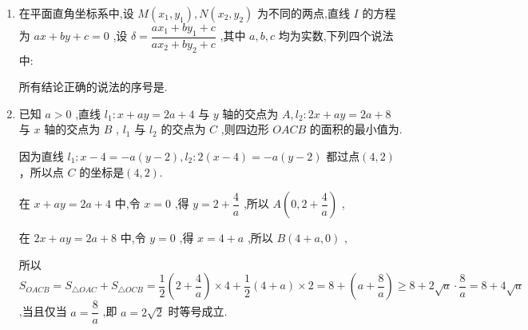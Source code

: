 \begin{enumerate}
    \item 在平面直角坐标系中,设 $M\left( {{x}_{1},{y}_{1}}\right) ,N\left( {{x}_{2},{y}_{2}}\right)$ 为不同的两点,直线 $I$ 的方程为 ${ax} + {by} + c = 0$ ,设 $\delta  = \dfrac{a{x}_{1} + b{y}_{1} + c}{a{x}_{2} + b{y}_{2} + c}$ ,其中 $a,b,c$ 均为实数,下列四个说法中:
    所有结论正确的说法的序号是.
    \begin{jieda}
    \end{jieda}
    
    \item 已知 $a > 0$ ,直线 ${l}_{1} : x + {ay} = {2a} + 4$ 与 $y$ 轴的交点为 ${A},{l}_{2} : {2x} + {ay} = {2a} + 8$ 与 $x$ 轴的交点为 $B$ , ${l}_{1}$ 与 ${l}_{2}$ 的交点为 $C$ ,则四边形 ${OACB}$ 的面积的最小值为.
    \begin{jieda}
        因为直线 ${l}_{1} : x - 4 =  - a\left( {y - 2}\right) ,{l}_{2} : 2\left( {x - 4}\right)  =  - a\left( {y - 2}\right)$ 都过点$(4,2)$，所以点 $C$ 的坐标是$(4,2)$.
        
        在 $x + {ay} = {2a} + 4$ 中,令 $x = 0$ ,得 $y = 2 + \dfrac{4}{a}$ ,所以 $A\left( {0,2 + \dfrac{4}{a}}\right)$ ,
        
        在 ${2x} + {ay} = {2a} + 8$ 中,令 $y = 0$ ,得 $x = 4 + a$ ,所以 $B\left( {4 + a,0}\right)$ ,
        
        所以 ${S}_{OACB} = {S}_{\bigtriangleup {OAC}} + {S}_{\bigtriangleup {OCB}} = \dfrac{1}{2}\left( {2 + \dfrac{4}{a}}\right)  \times  4 + \dfrac{1}{2}\left( {4 + a}\right)  \times  2 = 8 + \left( {a + \dfrac{8}{a}}\right)  \geq  8 + 2\sqrt{a} \cdot  \dfrac{8}{a} = 8 + 4\sqrt{a}$ ,当且仅当 $a = \dfrac{8}{a}$ ,即 $a = 2\sqrt{2}$ 时等号成立.
        

\end{jieda}
\end{enumerate}
